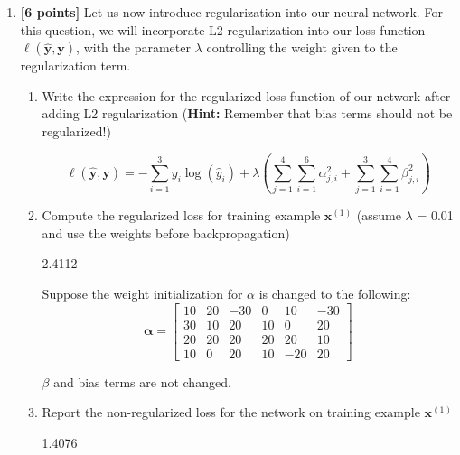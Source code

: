 \documentclass[11pt]{article}
\numberwithin{equation}{section} %
\numberwithin{figure}{section} %
\numberwithin{table}{section} %
\newcommand{\xv}{\mathbf{x}}
\newcommand{\yv}{\mathbf{y}}
\newcommand{\points}[1]{{\bf [#1 points]}}
\begin{document}
\begin{enumerate}
\clearpage
\item \points{6} Let us now introduce regularization into our neural network. For this question, we will incorporate L2 regularization into our loss function $\ell(\hat{\yv},\yv)$, with the parameter $\lambda$ controlling the weight given to the regularization term. 
\begin{enumerate}
    \item Write the expression for the regularized loss function of our network after adding L2 regularization (\textbf{Hint:} Remember that bias terms should not be regularized!) 
    \begin{tcolorbox}[fit,height=3cm, width=10cm, blank, borderline={1pt}{-2pt}]
            \begin{equation}\nonumber
            \ell(\hat{\yv},\yv) = - \sum_{i=1}^3 y_i \log(\hat{y}_i) + \lambda(\sum_{j=1}^4\sum_{i=1}^6\alpha_{j,i}^2 + \sum_{j=1}^3\sum_{i=1}^4\beta_{j,i}^2)
            \end{equation}
        \end{tcolorbox}
        
        
    \item Compute the regularized loss for training example $\xv^{(1)}$ (assume $\lambda$ = 0.01 and use the weights before backpropagation)
     \begin{tcolorbox}[fit,height=1cm, width=2cm, blank, borderline={1pt}{-2pt}]
            2.4112
        \end{tcolorbox}
        
        
    Suppose the weight initialization for $\alpha$ is changed to the following:
    $$\boldsymbol{\alpha}=
    \begin{bmatrix}
    10 & 20 & -30 & 0 & 10 & -30 \\
    30 & 10 & 20 & 10 & 0 & 20 \\
    20 & 20 & 20 & 20 & 20 & 10 \\
    10 & 0 & 20 & 10 & -20 & 20
    \end{bmatrix}$$
    
    $\beta$ and bias terms are not changed. \\
    
    \item Report the non-regularized loss for the network on training example $\xv^{(1)}$
    \begin{tcolorbox}[fit,height=1cm, width=2cm, blank, borderline={1pt}{-2pt}]
            1.4076 
        \end{tcolorbox}
        

\end{enumerate}
\end{enumerate}
\end{document}
